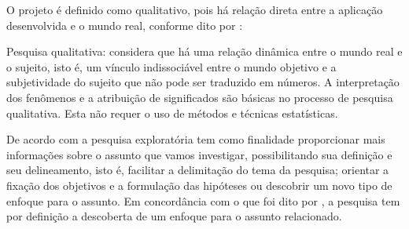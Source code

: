 O projeto é definido como qualitativo, pois há relação direta entre
a aplicação desenvolvida e o mundo real,
conforme dito por \textcite{prodanov2013}:

\begin{citacao}
    Pesquisa qualitativa: considera que há uma relação dinâmica
    entre o mundo real e o sujeito, isto é, um vínculo indissociável
    entre o mundo objetivo e a subjetividade do sujeito que não pode
    ser traduzido em números.
    A interpretação dos fenômenos e a atribuição de significados são
    básicas no processo de pesquisa qualitativa.
    Esta não requer o uso de métodos e técnicas estatísticas.
    \cite[p.~70]{prodanov2013}
\end{citacao}

De acordo com \textcite{prodanov2013} a pesquisa exploratória tem
como finalidade proporcionar mais informações sobre o assunto que
vamos investigar, possibilitando sua definição e seu delineamento,
isto é, facilitar a delimitação do tema da pesquisa; orientar a
fixação dos objetivos e a formulação das hipóteses ou descobrir um
novo tipo de enfoque para o assunto.
Em concordância com o que foi dito por \textcite{prodanov2013}, a
pesquisa tem por definição a descoberta de um enfoque para o assunto
relacionado.

